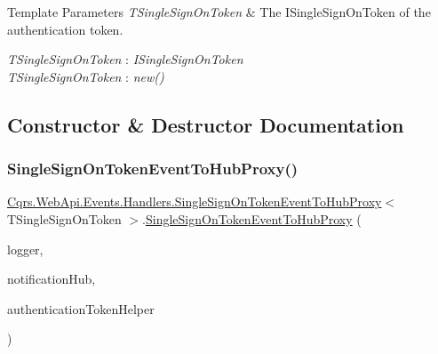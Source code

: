 \begin{DoxyTemplParams}{Template Parameters}
{\em T\+Single\+Sign\+On\+Token} & The I\+Single\+Sign\+On\+Token of the authentication token.\\
\hline
\end{DoxyTemplParams}
\begin{Desc}
\item[Type Constraints]\begin{description}
\item[{\em T\+Single\+Sign\+On\+Token} : {\em I\+Single\+Sign\+On\+Token}]\item[{\em T\+Single\+Sign\+On\+Token} : {\em new()}]\end{description}
\end{Desc}


\subsection{Constructor \& Destructor Documentation}
\mbox{\label{classCqrs_1_1WebApi_1_1Events_1_1Handlers_1_1SingleSignOnTokenEventToHubProxy_ad54ad4efb19787dbf07287bf1fa7816b_ad54ad4efb19787dbf07287bf1fa7816b}} 
\subsubsection{\texorpdfstring{Single\+Sign\+On\+Token\+Event\+To\+Hub\+Proxy()}{SingleSignOnTokenEventToHubProxy()}}
{\footnotesize\ttfamily \hyperlink{classCqrs_1_1WebApi_1_1Events_1_1Handlers_1_1SingleSignOnTokenEventToHubProxy}{Cqrs.\+Web\+Api.\+Events.\+Handlers.\+Single\+Sign\+On\+Token\+Event\+To\+Hub\+Proxy}$<$ T\+Single\+Sign\+On\+Token $>$.\hyperlink{classCqrs_1_1WebApi_1_1Events_1_1Handlers_1_1SingleSignOnTokenEventToHubProxy}{Single\+Sign\+On\+Token\+Event\+To\+Hub\+Proxy} (\begin{DoxyParamCaption}\item[{I\+Logger}]{logger,  }\item[{\hyperlink{interfaceCqrs_1_1WebApi_1_1SignalR_1_1Hubs_1_1INotificationHub}{I\+Notification\+Hub}}]{notification\+Hub,  }\item[{\hyperlink{interfaceCqrs_1_1Authentication_1_1IAuthenticationTokenHelper}{I\+Authentication\+Token\+Helper}$<$ T\+Single\+Sign\+On\+Token $>$}]{authentication\+Token\+Helper }\end{DoxyParamCaption})\hspace{0.3cm}{\ttfamily [protected]}}



